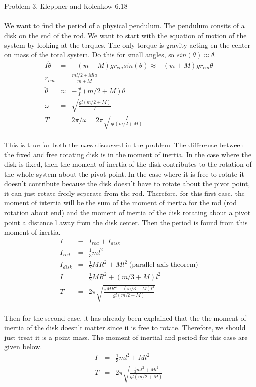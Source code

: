 \documentclass[11pt]{amsart}
\begin{document}
Problem 3. Kleppner and Kolenkow 6.18 \\ \\
We want to find the period of a physical pendulum. The pendulum consits of a disk on the end of the rod. We want to start with the equation of motion of the system by looking at the torques. The only torque is gravity acting on the center on mass of the total system. Do this for small angles, so $sin(\theta)\approx\theta$.\\
\begin{eqnarray*}
I\ddot{\theta} &=& -(m+M)gr_{cm}sin(\theta) \approx -(m+M)gr_{cm}\theta \\
r_{cm} &=& \frac{ml/2+Mla}{m+M} \\
\ddot{\theta} &\approx& -\frac{gl}{I}(m/2+M)\theta \\
\omega &=& \sqrt{\frac{gl(m/2+M)}{I}} \\
T &=& 2\pi/\omega = 2\pi\sqrt{\frac{I}{gl(m/2+M)}} 
\end{eqnarray*} \\
This is true for both the caes discussed in the problem. The difference between the fixed and free rotating disk is in the moment of inertia. In the case where the disk is fixed, then the moment of inertia of the disk contributes to the rotation of the whole system about the pivot point. In the case where it is free to rotate it doesn't contribute because the disk doesn't have to rotate about the pivot point, it can just rotate freely seperate from the rod. Therefore, for this first case, the moment of intertia will be the sum of the moment of inertia for the rod (rod rotation about end) and the moment of inertia of the disk rotating about a pivot point a distance l away from the disk center.  Then the period is found from this moment of inertia. \\
\begin{eqnarray*}
I &=& I_{rod}+I_{disk} \\
I_{rod} &=& \frac{1}{3}ml^{2} \\
I_{disk} &=& \frac{1}{2}MR^{2}+Ml^{2} \mbox{ (parallel axis theorem)} \\
I &=& \frac{1}{2}MR^{2}+(m/3+M)l^{2}  \\
T &=& 2\pi\sqrt{\frac{\frac{1}{2}MR^{2}+(m/3+M)l^{2}}{gl(m/2+M)}} 
\end{eqnarray*} \\
Then for the second case, it has already been explained that the the moment of inertia of the disk doesn't matter since it is free to rotate. Therefore, we should just treat it is a point mass. The moment of inertial and period for this case are given below. \\
\begin{eqnarray*}
I &=& \frac{1}{3}ml^{2}+Ml^{2} \\
T &=& 2\pi\sqrt{\frac{\frac{1}{3}ml^{2}+Ml^{2}}{gl(m/2+M)}} 
\end{eqnarray*} \\
\end{document}
